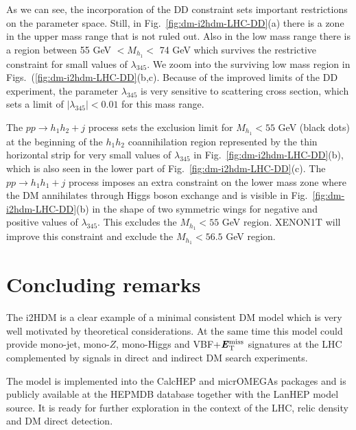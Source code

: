 \documentclass[12pt,a4paper]{article}
\newcommand{\MET}{\textbf{\textit{E}$_{\rm T}^{\rm miss}$}}
\begin{document}
As we can see, the incorporation of the DD constraint sets important restrictions on the parameter space. Still, in Fig.~\ref{fig:dm-i2hdm-LHC-DD}(a) there is a zone in the upper mass range that is not ruled out. Also in the low mass range there is a region between 55 GeV $< M_{h_1} <$ 74 GeV
which survives the restrictive constraint for small values of $\lambda_{345}$. We zoom into the surviving low mass region in Figs.~(\ref{fig:dm-i2hdm-LHC-DD}(b,c). Because of the improved limits of the DD experiment, the parameter $\lambda_{345}$ is very sensitive to scattering cross section, 
which sets a limit of $|\lambda_{345}|<0.01$ for this mass range.

The $pp \to h_1h_2+j$ process sets the exclusion limit for $M_{h_1}<55$ GeV (black dots) at the beginning of the $h_1 h_2$ coannihilation region represented by the thin horizontal strip for very small values of $\lambda_{345}$ in Fig.~\ref{fig:dm-i2hdm-LHC-DD}(b), which is also seen in the lower part of Fig.~\ref{fig:dm-i2hdm-LHC-DD}(c). The $pp \to h_1 h_1 + j$ process imposes an extra constraint on the lower mass zone where the DM annihilates through Higgs boson exchange and is visible in Fig.~\ref{fig:dm-i2hdm-LHC-DD}(b) in the shape of two symmetric wings for negative and positive values of $\lambda_{345}$. This excludes the $M_{h_1}<55$ GeV region. XENON1T will improve this constraint and exclude the $M_{h_1}<56.5$ GeV region.

%
\section{Concluding remarks}
The i2HDM is a clear example of a minimal consistent DM model which is
very well motivated by theoretical considerations.
At the same time this model could provide
 mono-jet, mono-$Z$, mono-Higgs and VBF+$\MET{}$
signatures at the LHC
complemented by
signals in direct and indirect DM search experiments.

The model is implemented into the CalcHEP and micrOMEGAs packages
and is publicly available at the HEPMDB database together with the
LanHEP model source. It is ready for further
exploration in the context of the LHC, relic density and DM direct detection.
\end{document}
